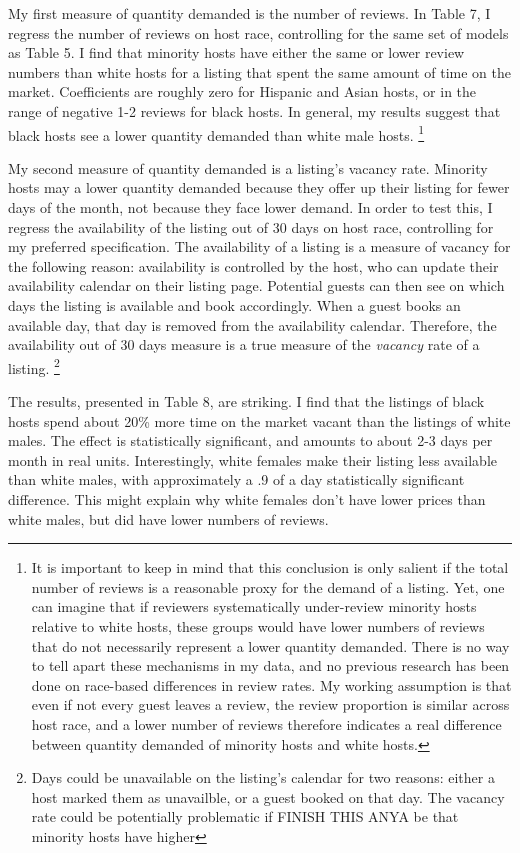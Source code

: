 My first measure of quantity demanded is the number of reviews. In Table 7, I regress the number of reviews on host race, controlling for the same set of models as Table 5. I find that minority hosts have either the same or lower review numbers than white hosts for a listing that spent the same amount of time on the market. Coefficients are roughly zero for Hispanic and Asian hosts, or in the range of negative 1-2 reviews for black hosts. In general, my results suggest that black hosts see a lower quantity demanded than white male hosts.%
	\footnote{It is important to keep in mind that this conclusion is only salient if the total number of reviews is a reasonable proxy for the demand of a listing. Yet, one can imagine that if reviewers systematically under-review minority hosts relative to white hosts, these groups would have lower numbers of reviews that do not necessarily represent a lower quantity demanded. There is no way to tell apart these mechanisms in my data, and no previous research has been done on race-based differences in review rates. My working assumption is that even if not every guest leaves a review, the review proportion is similar across host race, and a lower number of reviews therefore indicates a real difference between quantity demanded of minority hosts and white hosts. }

My second measure of quantity demanded is a listing's vacancy rate. Minority hosts may a lower quantity demanded because they offer up their listing for fewer days of the month, not because they face lower demand. In order to test this, I regress the availability of the listing out of 30 days on host race, controlling for my preferred specification. The availability of a listing is a measure of vacancy for the following reason: availability is controlled by the host, who can update their availability calendar on their listing page. Potential guests can then see on which days the listing is available and book accordingly. When a guest books an available day, that day is removed from the availability calendar. Therefore, the availability out of 30 days measure is a true measure of the \textit{vacancy} rate of a listing.%
	\footnote{Days could be unavailable on the listing's calendar for two reasons: either a host marked them as unavailble, or a guest booked on that day. The vacancy rate could be potentially problematic if FINISH THIS ANYA be that minority hosts have higher }

The results, presented in Table 8, are striking. I find that the listings of black hosts spend about 20\% more time on the market vacant than the listings of white males. The effect is statistically significant, and amounts to about 2-3 days per month in real units. Interestingly, white females make their listing less available than white males, with approximately a .9 of a day statistically significant difference. This might explain why white females don't have lower prices than white males, but did have lower numbers of reviews. 

